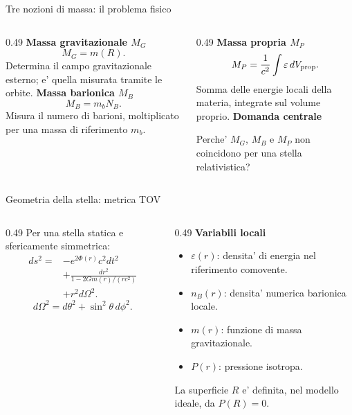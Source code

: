 \begin{frame}{Tre nozioni di massa: il problema fisico}
\small
\begin{columns}[T,onlytextwidth]
\begin{column}{0.49\textwidth}
\textbf{Massa gravitazionale $M_G$}
\[
M_G=m(R).
\]
Determina il campo gravitazionale esterno;
e' quella misurata tramite le orbite.
\medskip
\textbf{Massa barionica $M_B$}
\[
M_B=m_bN_B.
\]
Misura il numero di barioni, moltiplicato
per una massa di riferimento $m_b$.
\end{column}
\begin{column}{0.49\textwidth}
\textbf{Massa propria $M_P$}
\[
M_P=\frac{1}{c^2}\int\varepsilon\,dV_{\rm prop}.
\]
Somma delle energie locali della materia,
integrate sul volume proprio.
\medskip
\textbf{Domanda centrale}
\par\medskip
Perche' $M_G$, $M_B$ e $M_P$ non coincidono
per una stella relativistica?
\end{column}
\end{columns}
\end{frame}

\begin{frame}{Geometria della stella: metrica TOV}
\small
\begin{columns}[T,onlytextwidth]
\begin{column}{0.49\textwidth}
Per una stella statica e sfericamente simmetrica:
\[
\begin{aligned}
ds^2={}&-e^{2\Phi(r)}c^2dt^2\\
&+\frac{dr^2}{1-2Gm(r)/(rc^2)}\\
&+r^2d\Omega^2.
\end{aligned}
\]
\[
d\Omega^2=d\theta^2+\sin^2\theta\,d\phi^2.
\]
\end{column}
\begin{column}{0.49\textwidth}
\textbf{Variabili locali}
\begin{itemize}
\item $\varepsilon(r)$: densita' di energia
nel riferimento comovente.
\item $n_B(r)$: densita' numerica barionica locale.
\item $m(r)$: funzione di massa gravitazionale.
\item $P(r)$: pressione isotropa.
\end{itemize}
\medskip
La superficie $R$ e' definita, nel modello ideale,
da $P(R)=0$.
\end{column}
\end{columns}
\end{frame}

